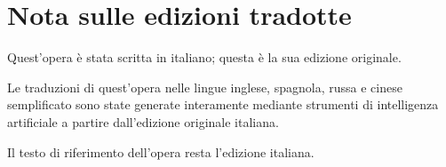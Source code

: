 \chapter*{Nota sulle edizioni tradotte}

Quest'opera è stata scritta in italiano; questa è la sua edizione originale.

Le traduzioni di quest'opera nelle lingue inglese, spagnola, russa e cinese semplificato sono state generate interamente mediante strumenti di intelligenza artificiale a partire dall'edizione originale italiana.

Il testo di riferimento dell'opera resta l'edizione italiana.
